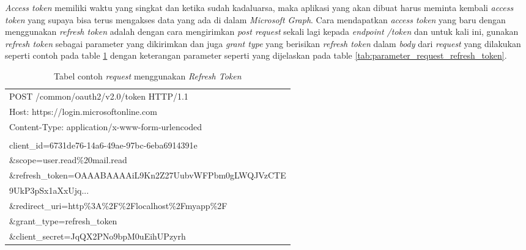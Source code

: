 \documentclass[a4paper,twoside]{article}
\begin{document}
\begin{enumerate}
\textit{Access token} memiliki waktu yang singkat dan ketika sudah kadaluarsa, maka aplikasi yang akan dibuat harus meminta kembali \textit{access token} yang supaya bisa terus mengakses data yang ada di dalam \textit{Microsoft Graph}. Cara mendapatkan \textit{access token} yang baru dengan menggunakan \textit{refresh token} adalah dengan cara mengirimkan \textit{post request} sekali lagi kepada \textit{endpoint /token} dan untuk kali ini, gunakan \textit{refresh token} sebagai parameter yang dikirimkan dan juga \textit{grant type} yang berisikan \textit{refresh token} dalam \textit{body} dari \textit{request} yang dilakukan seperti contoh pada table \ref{tab:contoh_request_refresh_token} dengan keterangan parameter seperti yang dijelaskan pada table \ref{tab:parameter_request_refresh_token}. 

\begin{table}[H]
	\centering 
	\caption{Tabel contoh \textit{request} menggunakan \textit{Refresh Token}}
	\label{tab:contoh_request_refresh_token}
	\begin{tabular}{|p{12cm}|}
	\hline
	POST /common/oauth2/v2.0/token HTTP/1.1\\
Host: https://login.microsoftonline.com\\
Content-Type: application/x-www-form-urlencoded\\
\\
client\_id=6731de76-14a6-49ae-97bc-6eba6914391e\\
\&scope=user.read\%20mail.read\\
\&refresh\_token=OAAABAAAAiL9Kn2Z27UubvWFPbm0gLWQJVzCTE\\
9UkP3pSx1aXxUjq...\\
\&redirect\_uri=http\%3A\%2F\%2Flocalhost\%2Fmyapp\%2F\\
\&grant\_type=refresh\_token\\
\&client\_secret=JqQX2PNo9bpM0uEihUPzyrh\\
	\hline
	\end{tabular}  
\end{table}


\end{enumerate}
\end{document}
